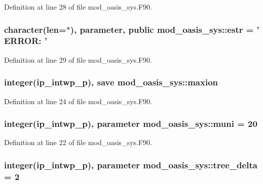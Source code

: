 Definition at line 28 of file mod\+\_\+oasis\+\_\+sys.\+F90.

\hypertarget{classmod__oasis__sys_a0f6e0376585c6f39d653f5ab05e80e8f}{
\subsubsection[{estr}]{\setlength{\rightskip}{0pt plus 5cm}character(len=$\ast$), parameter, public mod\+\_\+oasis\+\_\+sys\+::estr = ' E\+R\+R\+O\+R\+: '}}\label{classmod__oasis__sys_a0f6e0376585c6f39d653f5ab05e80e8f}


Definition at line 29 of file mod\+\_\+oasis\+\_\+sys.\+F90.

\hypertarget{classmod__oasis__sys_a9dc0e2d10d9e8e8c23e391467ae2eee4}{
\subsubsection[{maxion}]{\setlength{\rightskip}{0pt plus 5cm}integer(ip\+\_\+intwp\+\_\+p), save mod\+\_\+oasis\+\_\+sys\+::maxion\hspace{0.3cm}{\ttfamily [private]}}}\label{classmod__oasis__sys_a9dc0e2d10d9e8e8c23e391467ae2eee4}


Definition at line 24 of file mod\+\_\+oasis\+\_\+sys.\+F90.

\hypertarget{classmod__oasis__sys_a7e34042b8f7e733f15516c7d544338a2}{
\subsubsection[{muni}]{\setlength{\rightskip}{0pt plus 5cm}integer(ip\+\_\+intwp\+\_\+p), parameter mod\+\_\+oasis\+\_\+sys\+::muni = 20\hspace{0.3cm}{\ttfamily [private]}}}\label{classmod__oasis__sys_a7e34042b8f7e733f15516c7d544338a2}


Definition at line 22 of file mod\+\_\+oasis\+\_\+sys.\+F90.

\hypertarget{classmod__oasis__sys_ad7e3af62b75730bc71be0df8ae50cf0a}{
\subsubsection[{tree\+\_\+delta}]{\setlength{\rightskip}{0pt plus 5cm}integer(ip\+\_\+intwp\+\_\+p), parameter mod\+\_\+oasis\+\_\+sys\+::tree\+\_\+delta = 2\hspace{0.3cm}{\ttfamily [private]}}}\label{classmod__oasis__sys_ad7e3af62b75730bc71be0df8ae50cf0a}


